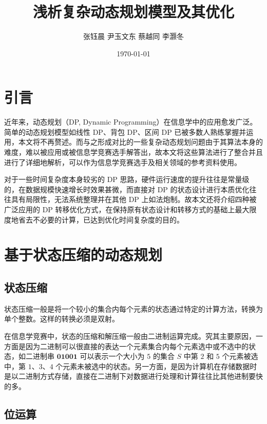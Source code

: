 \documentclass[a4paper, UTF8]{ctexart}
\title{浅析复杂动态规划模型及其优化}
\author{张钰晨 尹玉文东 蔡越同 李灏冬}
\date{\today}
\begin{document}
\providecommand{\tightlist}{%
  \setlength{\itemsep}{0pt}
  \setlength{\parskip}{0pt}
  \setlength{\itemindent}{1em}
}

\songti
\maketitle
\pagestyle{plain}

\section{引言}

近年来，动态规划（DP, Dynamic
Programming）在信息学中的应用愈发广泛。简单的动态规划模型如线性 DP、背包
DP、区间 DP
已被多数人熟练掌握并运用，本文将不再赘述。而与之形成对比的一些复杂动态规划问题由于其算法本身的难度，难以被应用或被信息学竞赛选手解答出，故本文将这些算法进行了整合并且进行了详细地解析，可以作为信息学竞赛选手及相关领域的参考资料使用。

对于一些时间复杂度本身较劣的 DP
思路，硬件运行速度的提升往往是常量级的，在数据规模快速增长时效果甚微，而直接对
DP 的状态设计进行本质优化往往具有局限性，无法系统整理并在其他 DP
上如法炮制。故本文还将介绍四种被广泛应用的 DP
转移优化方式，在保持原有状态设计和转移方式的基础上最大限度地省去不必要的计算，已达到优化时间复杂度的目的。

\section{基于状态压缩的动态规划}

\subsection{状态压缩}

状态压缩一般是将一个较小的集合内每个元素的状态通过特定的计算方法，转换为单个整数。这样的转换必须是双射。

在信息学竞赛中，状态的压缩和解压缩一般由二进制运算完成。究其主要原因，一方面是因为二进制可以很直接的表达一个元素集合内每个元素选中或不选中的状态，如二进制串
\(\mathbf{01001}\) 可以表示一个大小为 \(5\) 的集合 \(S\) 中第 \(2\) 和
\(5\) 个元素被选中，第 \(1\)、\(3\)、\(4\)
个元素未被选中的状态。另一方面，是因为计算机在存储数据时是以二进制方式存储，直接在二进制下对数据进行处理和计算往往比其他进制要快的多。

\subsection{位运算}
\end{document}
